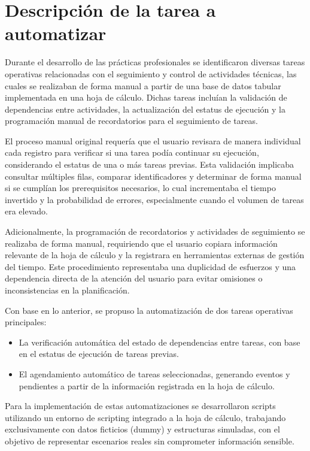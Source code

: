 \documentclass[12pt]{article}
\begin{document}
\section*{Descripción de la tarea a automatizar}

Durante el desarrollo de las prácticas profesionales se identificaron diversas tareas operativas relacionadas con el seguimiento y control de actividades técnicas, las cuales se realizaban de forma manual a partir de una base de datos tabular implementada en una hoja de cálculo. Dichas tareas incluían la validación de dependencias entre actividades, la actualización del estatus de ejecución y la programación manual de recordatorios para el seguimiento de tareas.

El proceso manual original requería que el usuario revisara de manera individual cada registro para verificar si una tarea podía continuar su ejecución, considerando el estatus de una o más tareas previas. Esta validación implicaba consultar múltiples filas, comparar identificadores y determinar de forma manual si se cumplían los prerequisitos necesarios, lo cual incrementaba el tiempo invertido y la probabilidad de errores, especialmente cuando el volumen de tareas era elevado.

Adicionalmente, la programación de recordatorios y actividades de seguimiento se realizaba de forma manual, requiriendo que el usuario copiara información relevante de la hoja de cálculo y la registrara en herramientas externas de gestión del tiempo. Este procedimiento representaba una duplicidad de esfuerzos y una dependencia directa de la atención del usuario para evitar omisiones o inconsistencias en la planificación.

Con base en lo anterior, se propuso la automatización de dos tareas operativas principales:

\begin{itemize}
    \item La verificación automática del estado de dependencias entre tareas, con base en el estatus de ejecución de tareas previas.
    \item El agendamiento automático de tareas seleccionadas, generando eventos y pendientes a partir de la información registrada en la hoja de cálculo.
\end{itemize}

Para la implementación de estas automatizaciones se desarrollaron scripts utilizando un entorno de scripting integrado a la hoja de cálculo, trabajando exclusivamente con datos ficticios (dummy) y estructuras simuladas, con el objetivo de representar escenarios reales sin comprometer información sensible.
\end{document}

